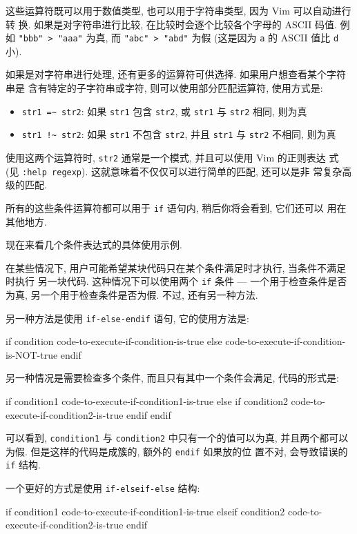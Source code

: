 这些运算符既可以用于数值类型, 也可以用于字符串类型, 因为 Vim 可以自动进行转
换. 如果是对字符串进行比较, 在比较时会逐个比较各个字母的 ASCII 码值. 例如
\texttt{"bbb" > "aaa"} 为真, 而 \texttt{"abc" > "abd"} 为假 (这是因为
\texttt{a} 的 ASCII 值比 \texttt{d} 小).

如果是对字符串进行处理, 还有更多的运算符可供选择. 如果用户想查看某个字符串是
含有特定的子字符串或字符, 则可以使用部分匹配运算符, 使用方式是:
\begin{itemize}
    \item \verb'str1 =~ str2': 如果 \texttt{str1} 包含 \texttt{str2}, 或
        \texttt{str1} 与 \texttt{str2} 相同, 则为真
    \item \verb'str1 !~ str2': 如果 \texttt{str1} 不包含 \texttt{str2}, 并且
        \texttt{str1} 与 \texttt{str2} 不相同, 则为真
\end{itemize}

使用这两个运算符时, \texttt{str2} 通常是一个模式, 并且可以使用 Vim 的正则表达
式 (见 \texttt{:help regexp}). 这就意味着不仅仅可以进行简单的匹配, 还可以是非
常复杂高级的匹配.

所有的这些条件运算符都可以用于 \texttt{if} 语句内, 稍后你将会看到, 它们还可以
用在其他地方.

现在来看几个条件表达式的具体使用示例.

在某些情况下, 用户可能希望某块代码只在某个条件满足时才执行, 当条件不满足时执行
另一块代码. 这种情况下可以使用两个 \texttt{if} 条件 ---  一个用于检查条件是否
为真, 另一个用于检查条件是否为假. 不过, 还有另一种方法.

另一种方法是使用 \texttt{if-else-endif} 语句, 它的使用方法是:
\begin{vimcode}
if condition
    code-to-execute-if-condition-is-true
else
    code-to-execute-if-condition-is-NOT-true
endif
\end{vimcode}

另一种情况是需要检查多个条件, 而且只有其中一个条件会满足, 代码的形式是:
\begin{vimcode}
if condition1
    code-to-execute-if-condition1-is-true
else
    if condition2
        code-to-execute-if-condition2-is-true
    endif
endif
\end{vimcode}

可以看到, \texttt{condition1} 与 \texttt{condition2} 中只有一个的值可以为真,
并且两个都可以为假. 但是这样的代码是成簇的, 额外的 \texttt{endif} 如果放的位
置不对, 会导致错误的 \texttt{if} 结构.

一个更好的方式是使用 \texttt{if-elseif-else} 结构:
\begin{vimcode}
if condition1
    code-to-execute-if-condition1-is-true
elseif condition2
    code-to-execute-if-condition2-is-true
endif
\end{vimcode}

